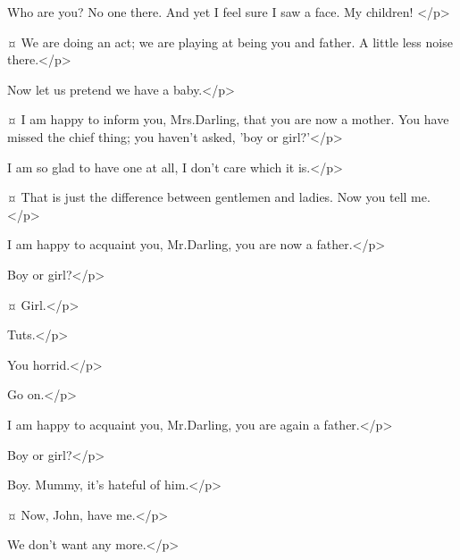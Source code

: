 \begin{drama}

\mrsdarlingspeaks
Who are you?
No one there.
And yet I feel sure I saw a face.
My children!
</p>

\johnspeaks {}¤
We are doing an act; we are playing at being you and father.
A little less noise there.</p>

\wendyspeaks
Now let us pretend we have a baby.</p>

\johnspeaks {}¤
I am happy to inform you, Mrs.\@ Darling, that you are now a mother.
You have missed the chief thing; you haven't asked, 'boy or girl?'</p>

\wendyspeaks
I am so glad to have one at all, I don't care which it is.</p>

\johnspeaks {}¤
That is just the difference between gentlemen and ladies.
Now you tell me.</p>

\wendyspeaks
I am happy to acquaint you, Mr.\@ Darling, you are now a father.</p>

\johnspeaks
Boy or girl?</p>

\wendyspeaks {}¤
Girl.</p>

\johnspeaks
Tuts.</p>

\wendyspeaks
You horrid.</p>

\johnspeaks
Go on.</p>

\wendyspeaks
I am happy to acquaint you, Mr.\@ Darling, you are again a father.</p>

\johnspeaks
Boy or girl?</p>

\wendyspeaks
Boy.
Mummy, it's hateful of him.</p>


\michaelspeaks {}¤
Now, John, have me.</p>

\johnspeaks
We don't want any more.</p>


\end{drama}
